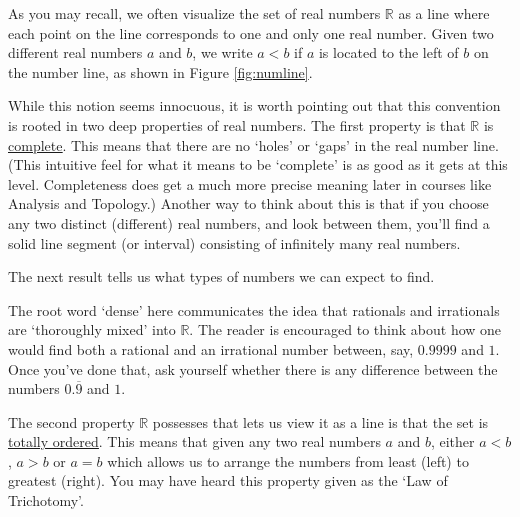 As you may recall, we often visualize the set of real numbers $\mathbb{R}$ as a line where each point on the line corresponds to one and only one real number.  Given two different real numbers $a$ and $b$,  we write $a < b$ if $a$ is located to the left of $b$ on the number line, as shown in Figure \ref{fig:numline}.




While this notion seems innocuous, it is worth pointing out that this convention is rooted in two deep properties of real numbers.  The first property is that $\mathbb{R}$ is  \href{http://en.wikipedia.org/wiki/Complete_metric_space}{\underline{complete}}. This means that there are no `holes' or `gaps' in the real number line. (This intuitive feel for what it means to be `complete' is as good as it gets at this level.  Completeness does get a much more precise meaning later in courses like Analysis and Topology.) Another way to think about this is that if you choose any two distinct (different) real numbers, and look between them, you'll find a solid line segment (or interval) consisting of infinitely many real numbers.  


The next result tells us what types of numbers we can expect to find.

\medskip


\medskip

The root word `dense' here communicates the idea that rationals and irrationals are `thoroughly mixed' into $\mathbb{R}$.   The reader is encouraged to think about how one would find both a rational and an irrational number between, say, $0.9999$ and $1$. Once you've done that, ask yourself whether there is any difference between the numbers $0.\overline{9}$ and $1$. 

\smallskip

The second property $\mathbb{R}$ possesses that lets us view it as a line is that the set is \href{http://en.wikipedia.org/wiki/Total_order}{\underline{totally ordered}}. This means that given any two real numbers $a$ and $b$, either $a < b$, $a > b$ or $a = b$ which allows us to arrange the numbers from least (left) to greatest (right). You may have heard this property given as the `Law of Trichotomy'.

